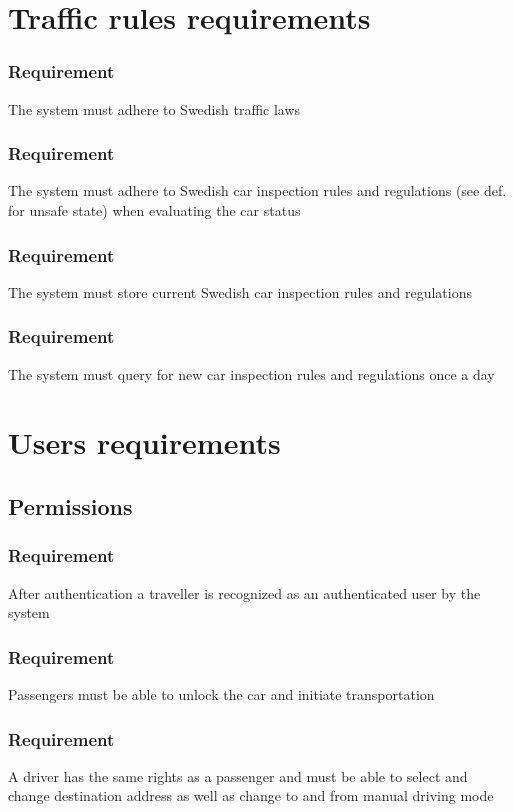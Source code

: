 \documentclass{article}
\begin{document}
{\section{Traffic rules requirements}
    \setcounter{subsubsection}{0}
    \subsubsection{Requirement}
\hfill \break 
\- \- \-The system must adhere to Swedish traffic laws
    \subsubsection{Requirement}
\hfill \break 
\- \- \-The system must adhere to Swedish car inspection rules and regulations (see def. for unsafe state) when evaluating the car status
    \subsubsection{Requirement}
\hfill \break 
\- \- \-The system must store current Swedish car inspection rules and regulations
    \subsubsection{Requirement}
\hfill \break 
\- \- \-The system must query for new car inspection rules and regulations once a day

\section{Users requirements}
  \subsection{Permissions}
      \subsubsection{Requirement}
\hfill \break 
\- \- \-After authentication a traveller is recognized as an authenticated user by the system
      \subsubsection{Requirement}
\hfill \break 
\- \- \-Passengers must be able to unlock the car and initiate transportation
      \subsubsection{Requirement}
\hfill \break 
\- \- \-A driver has the same rights as a passenger and must be able to select and change destination address as well as change to and from manual driving mode
}
\end{document}

